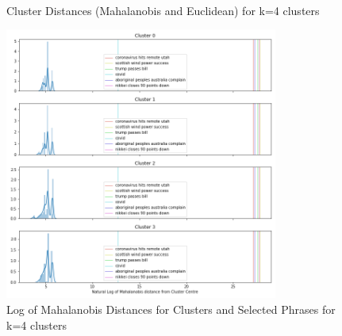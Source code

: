 \begin{appendices}
	\begin{figure}[H]
		\centering
		\\
		
		\caption{Cluster Distances (Mahalanobis and Euclidean) for k=4 clusters}
		\label{fig:distk4}
	\end{figure}
	
	
	\begin{figure}[H]
		\centering
		\includegraphics[width=0.8\textwidth]{images/words_kmeans_mahalanobis_distance_k=4.png}
		\caption{Log of Mahalanobis Distances for Clusters and Selected Phrases for k=4 clusters}
		\label{fig:wordsk4}
	\end{figure}
\end{appendices}

